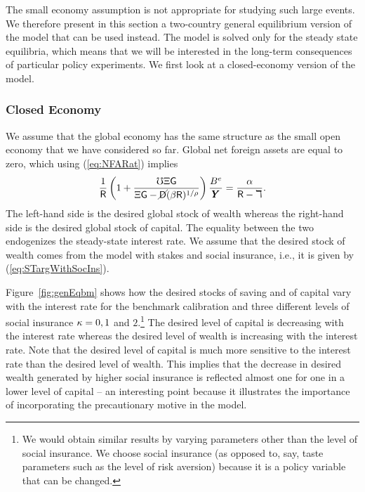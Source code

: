 \documentclass[titlepage,abstract,letterpaper]{econtex}
\renewcommand{\GDPLev}{\ensuremath{\pmb{Y}}}
\begin{document}
The small economy assumption is not appropriate for studying such
large events.  We therefore present in this section a two-country general
equilibrium version of the model that can be used instead. The model
is solved only for the steady state equilibria, which means that we
will be interested in the long-term consequences of particular policy
experiments. We first look at a closed-economy version of the model.

\subsubsection{Closed Economy}

We assume that the global economy has the same structure as the small
open economy that we have considered so far.  Global net foreign
assets are equal to zero, which using (\ref{eq:NFARat}) implies
\begin{equation}
\frac{1}{\Rfree} \left( 1 + \frac{\urate \EmpGro \WGro}{\EmpGro \WGro -\PLives(\Discount \Rfree )^{1/\CRRA}} \right) \frac{\BLevE}{\GDPLev} =\frac{\kapShare}{\Rfree-\DeprFac}.
\label{eq:closed}
\end{equation}
The left-hand side is the desired global stock of wealth whereas the
right-hand side is the desired global stock of capital. The equality
between the two endogenizes the steady-state interest rate. We assume
that the desired stock of wealth comes from the model with stakes and
social insurance, i.e., it is given by (\ref{eq:STargWithSocIns}).

Figure~\ref{fig:genEqbm} shows how the desired stocks of saving and of capital vary
with the interest rate for the benchmark calibration and three
different levels of social insurance $\kappa=0, 1$ and
$2$.\footnote{We would obtain similar results by varying parameters
  other than the level of social insurance. We choose social insurance
  (as opposed to, say, taste parameters such as the level of risk
  aversion) because it is a policy variable that can be changed.} The
desired level of capital is decreasing with the interest rate whereas
the desired level of wealth is increasing with the interest rate. Note
that the desired level of capital is much more sensitive to the
interest rate than the desired level of wealth. This implies that the
decrease in desired wealth generated by higher social insurance is
reflected almost one for one in a lower level of capital -- an interesting
point because it illustrates the importance of incorporating the precautionary
motive in the model.
\end{document}
